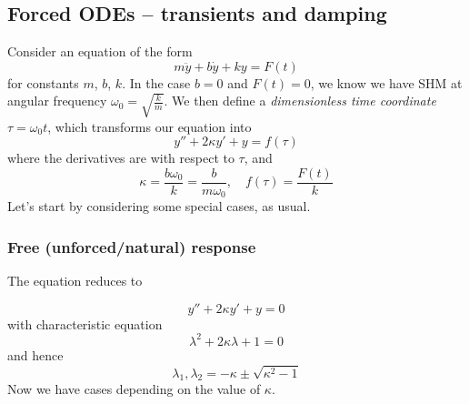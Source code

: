 \documentclass{../template/note}
\begin{document}
    \subsection{Forced ODEs -- transients and damping}

    Consider an equation of the form
    \[
        m \ddot y + b \dot y + ky = F(t)
    \]
    for constants \(m\), \(b\), \(k\). In the case \(b = 0\) and \(F(t) = 0\), we know we have SHM at angular frequency \(\omega_0 = \sqrt{\frac{k}{m}}\). We then define a \emph{dimensionless time coordinate} \(\tau = \omega_0 t\), which transforms our equation into
    \[
        y'' + 2 \kappa y' + y = f(\tau)
    \]
    where the derivatives are with respect to \(\tau\), and
    \[
        \kappa = \frac{b\omega_0}{k} = \frac{b}{m\omega_0}, \quad f(\tau) = \frac{F(t)}{k}
    \]
    Let's start by considering some special cases, as usual.
    
    \subsubsection{Free (unforced/natural) response}

    The equation reduces to

    \[
        y'' + 2\kappa y' + y = 0
    \]
    with characteristic equation
    \[
        \lambda^2 + 2 \kappa \lambda + 1 = 0
    \]
    and hence
    \[
        \lambda_1, \lambda_2 = -\kappa \pm \sqrt{\kappa^2-1}
    \]
    Now we have cases depending on the value of \(\kappa\).
\end{document}
